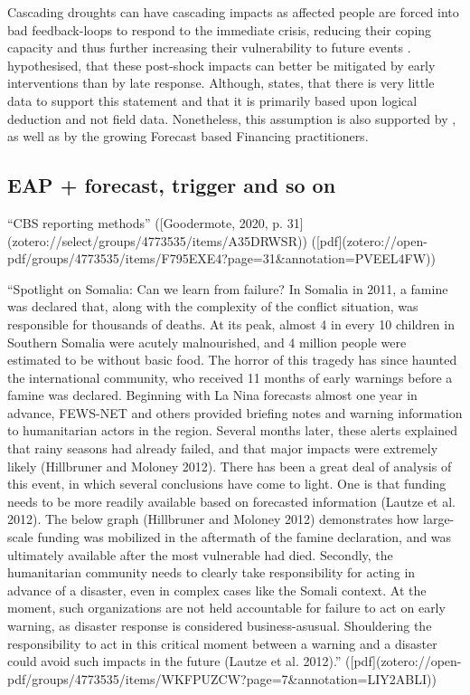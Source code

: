 {Cascading droughts can have cascading impacts as affected people are forced into bad feedback-loops to respond to the immediate crisis, reducing their coping capacity and thus further increasing their vulnerability to future events \autocite{usaidEconomicsResilienceDrought2018}. \autocite{usaidEconomicsResilienceDrought2018} hypothesised, that these post-shock impacts can better be mitigated by early interventions than by late response. Although, \autocite{usaidEconomicsResilienceDrought2018} states, that there is very little data to support this statement and that it is primarily based upon logical deduction and not field data. Nonetheless, this assumption is also supported by \autocite{aliMitigatingNaturalDisasters2017a}, \autocite{abdulkadirAssessmentDroughtRecurrence2017} as well as by the growing Forecast based Financing practitioners.


\subsection{EAP + forecast, trigger and so on}

“CBS reporting methods” ([Goodermote, 2020, p. 31](zotero://select/groups/4773535/items/A35DRWSR)) ([pdf](zotero://open-pdf/groups/4773535/items/F795EXE4?page=31&annotation=PVEEL4FW))

“Spotlight on Somalia: Can we learn from failure? In Somalia in 2011, a famine was declared that, along with the complexity of the conflict situation, was responsible for thousands of deaths. At its peak, almost 4 in every 10 children in Southern Somalia were acutely malnourished, and 4 million people were estimated to be without basic food. The horror of this tragedy has since haunted the international community, who received 11 months of early warnings before a famine was declared. Beginning with La Nina forecasts almost one year in advance, FEWS-NET and others provided briefing notes and warning information to humanitarian actors in the region. Several months later, these alerts explained that rainy seasons had already failed, and that major impacts were extremely likely (Hillbruner and Moloney 2012). There has been a great deal of analysis of this event, in which several conclusions have come to light. One is that funding needs to be more readily available based on forecasted information (Lautze et al. 2012). The below graph (Hillbruner and Moloney 2012) demonstrates how large-scale funding was mobilized in the aftermath of the famine declaration, and was ultimately available after the most vulnerable had died. Secondly, the humanitarian community needs to clearly take responsibility for acting in advance of a disaster, even in complex cases like the Somali context. At the moment, such organizations are not held accountable for failure to act on early warning, as disaster response is considered business-asusual. Shouldering the responsibility to act in this critical moment between a warning and a disaster could avoid such impacts in the future (Lautze et al. 2012).” ([pdf](zotero://open-pdf/groups/4773535/items/WKFPUZCW?page=7&annotation=LIY2ABLI))

}
